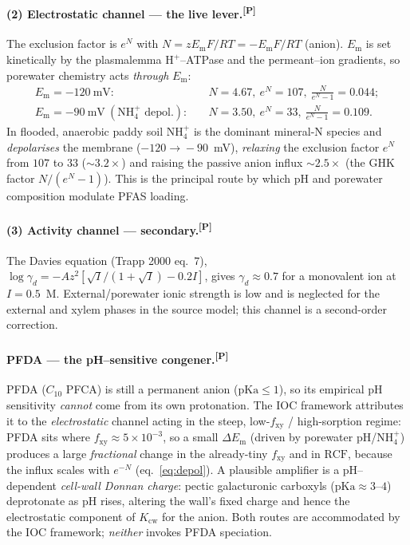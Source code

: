 \documentclass[11pt]{article}
\newcommand{\cP}{\textsuperscript{\textcolor{cPcol}{[P]}}}
\newcommand{\fxy}{\ensuremath{f_{\mathrm{xy}}}}
\newcommand{\Kcw}{\ensuremath{K_{\mathrm{cw}}}}
\newcommand{\Em}{\ensuremath{E_{\mathrm{m}}}}
\newcommand{\RCF}{\ensuremath{\mathrm{RCF}}}
\begin{document}
\paragraph{(2) Electrostatic channel --- the live lever.\cP}
The exclusion factor is $e^{N}$ with $N=z\Em F/RT=-\Em F/RT$ (anion). $\Em$ is set kinetically by
the plasmalemma $\mathrm{H^+}$--ATPase and the permeant--ion gradients, so porewater chemistry acts
\emph{through} $\Em$:
\begin{equation}\label{eq:depol}
\begin{aligned}
\Em=-120~\mathrm{mV}:&\quad N=4.67,\ e^{N}=107,\ \tfrac{N}{e^{N}-1}=0.044;\\
\Em=-90~\mathrm{mV}\ (\mathrm{NH_4^+}\text{ depol.}):&\quad N=3.50,\ e^{N}=33,\
\tfrac{N}{e^{N}-1}=0.109.
\end{aligned}
\end{equation}
In flooded, anaerobic paddy soil $\mathrm{NH_4^+}$ is the dominant mineral-N species and
\emph{depolarises} the membrane ($-120\!\to\!-90$~mV), \emph{relaxing} the exclusion factor $e^{N}$
from $107$ to $33$ ($\sim\!3.2\times$) and raising the passive anion influx
$\sim\!2.5\times$ (the GHK factor $N/(e^N-1)$). This is the principal route by which pH and
porewater composition modulate PFAS loading.

\paragraph{(3) Activity channel --- secondary.\cP}
The Davies equation (Trapp 2000 eq.~7), $\log\gamma_d=-Az^2\!\left[\sqrt{I}/(1+\sqrt{I})-0.2I\right]$,
gives $\gamma_d\approx0.7$ for a monovalent ion at $I=0.5$~M. External/porewater ionic strength is
low and is neglected for the external and xylem phases in the source model; this channel is a
second-order correction.

\paragraph{PFDA --- the pH--sensitive congener.\cP}
PFDA ($C_{10}$ PFCA) is still a permanent anion ($\mathrm{pKa}\le1$), so its empirical pH
sensitivity \emph{cannot} come from its own protonation. The IOC framework attributes it to the
\emph{electrostatic} channel acting in the steep, low-$\fxy$ / high-sorption regime: PFDA sits where
$\fxy\approx5\times10^{-3}$, so a small $\Delta\Em$ (driven by porewater pH/$\mathrm{NH_4^+}$)
produces a large \emph{fractional} change in the already-tiny $\fxy$ and in $\RCF$, because the
influx scales with $e^{-N}$ (eq.~\ref{eq:depol}). A plausible amplifier is a pH--dependent
\emph{cell-wall Donnan charge}: pectic galacturonic carboxyls ($\mathrm{pKa}\approx3$--$4$)
deprotonate as pH rises, altering the wall's fixed charge and hence the electrostatic component of
$\Kcw$ for the anion. Both routes are accommodated by the IOC framework; \emph{neither} invokes
PFDA speciation.
\end{document}
